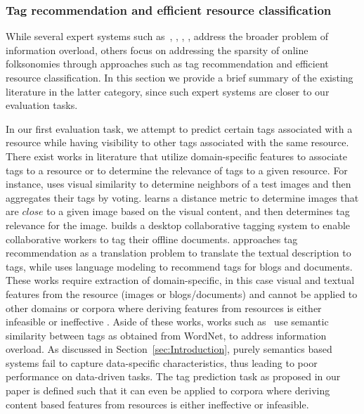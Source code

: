 {\subsubsection{Tag recommendation and efficient resource classification} 

While several expert systems such as~\cite{DeepaFolkso14}, \cite{ShuhuiAuthor15}, \cite{ZhengRecom10}, \cite{MohdSemantic13}, \cite{HyunwooFrame14} address the broader problem of information overload, others focus on addressing the sparsity of online folksonomies through approaches such as tag recommendation and efficient resource classification. In this section we provide a brief summary of the existing literature in the latter category, since such expert systems are closer to our evaluation tasks. 


In our first evaluation task, we attempt to predict certain tags associated with a resource while having visibility to other tags associated with the same resource. There exist works in literature that utilize domain-specific features to associate tags to a resource or to determine the relevance of tags to a given resource. For instance, {\cite{li2009learning}} uses visual similarity to determine neighbors of a test images and then aggregates their tags by voting. {\cite{wu2009distance}} learns a distance metric to determine images that are $close$ to a given image based on the visual content, and then determines tag relevance for the image. \cite{HsiehCollab09} builds a desktop collaborative tagging system to enable collaborative workers to tag their offline documents. \cite{ChenEstim15} approaches tag recommendation as a translation problem to translate the textual description to tags, while \cite{SunLang11} uses language modeling to recommend tags for blogs and documents. These works require extraction of domain-specific, in this case visual and textual features from the resource (images or blogs/documents) and cannot be applied to other domains or corpora where deriving features from resources is either infeasible or ineffective {\cite{huang2010text}\cite{song2010taxonomic}\cite{zanetti2008walk}\cite{yin2009exploring}}.
Aside of these works, works such as~\cite{MohdSemantic13} use semantic similarity between tags as obtained from WordNet, to address information overload. As discussed in Section~\ref{sec:Introduction}, purely semantics based systems fail to capture data-specific characteristics, thus leading to poor performance on data-driven tasks. 
The tag prediction task as proposed in our paper is defined such that it can even be applied to corpora where deriving content based features from resources is either ineffective or infeasible.
}
